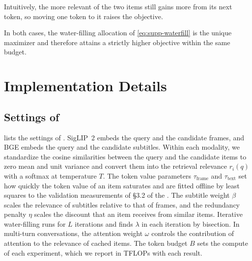 \noindent Intuitively, the more relevant of the two items still gains more from its next token, so moving one token to it raises the objective.

In both cases, the water-filling allocation of \cref{eq:supp-waterfill} is the unique maximizer and therefore attains a strictly higher objective within the same budget.

\section{Implementation Details}
\label{sec:supp-impl}

\subsection{Settings of \name}
\label{sec:supp-settings}

 lists the settings of \name. SigLIP~2 embeds the query and the candidate frames, and BGE embeds the query and the candidate subtitles. Within each modality, we standardize the cosine similarities between the query and the candidate items to zero mean and unit variance and convert them into the retrieval relevance $r_i(q)$ with a softmax at temperature $T$. The token value parameters $\tau_{\text{frame}}$ and $\tau_{\text{text}}$ set how quickly the token value of an item saturates and are fitted offline by least squares to the validation measurements of \S3.2 of the \mainpaper. The subtitle weight $\beta$ scales the relevance of subtitles relative to that of frames, and the redundancy penalty $\eta$ scales the discount that an item receives from similar items. Iterative water-filling runs for $L$ iterations and finds $\lambda$ in each iteration by bisection. In multi-turn conversations, the attention weight $\omega$ controls the contribution of attention to the relevance of cached items. The token budget $B$ sets the compute of each experiment, which we report in TFLOPs with each result.

